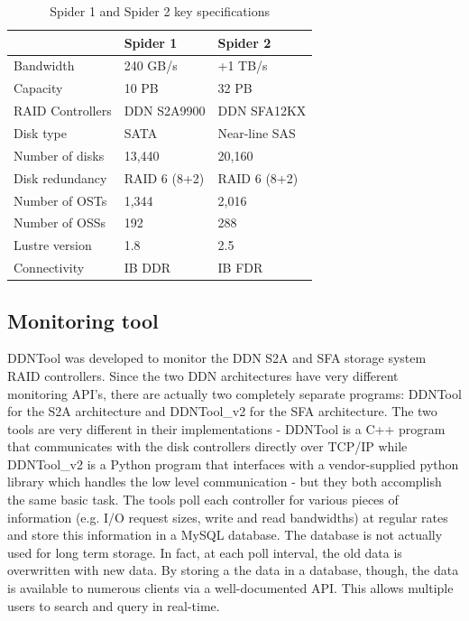 \begin{table}
\begin{center}
\caption{Spider 1 and Spider 2 key specifications}
\begin{tabular}{l||l|l}
 & Spider 1 & Spider 2\\
\hline
Bandwidth & 240 GB/s & +1 TB/s \\
Capacity & 10 PB & 32 PB \\
RAID Controllers & DDN S2A9900 & DDN SFA12KX\\
Disk type & SATA & Near-line SAS\\
Number of disks & 13,440 & 20,160\\
Disk redundancy & RAID 6 (8+2) & RAID 6 (8+2)\\
Number of OSTs & 1,344 & 2,016\\
Number of OSSs & 192 & 288\\
Lustre version & 1.8 & 2.5\\
Connectivity & IB DDR & IB FDR\\ 
\end{tabular}
\end{center}
\label{table:spider12}
\end{table}


\subsection{Monitoring tool}

DDNTool \cite{ddntool10:ross} was developed to monitor the DDN S2A and SFA
storage system RAID controllers. Since the two DDN architectures have very
different monitoring API's, there are actually two completely separate
programs:  DDNTool for the S2A architecture and DDNTool\_v2 for the SFA
architecture.  The two tools are very different in their implementations -
DDNTool is a C++ program that communicates with the disk controllers directly
over TCP/IP while DDNTool\_v2 is a Python program that interfaces with a
vendor-supplied python library which handles the low level communication - but
they both accomplish the same basic task.  The tools poll each controller for
various pieces of information (e.g. I/O request sizes, write and read
bandwidths) at regular rates and store this information in a MySQL database.
The database is not actually used for long term storage.  In fact, at each poll
interval, the old data is overwritten with new data.  By storing a the data in
a database, though, the data is available to numerous clients via a
well-documented API.  This allows multiple users to search and query in
real-time.

